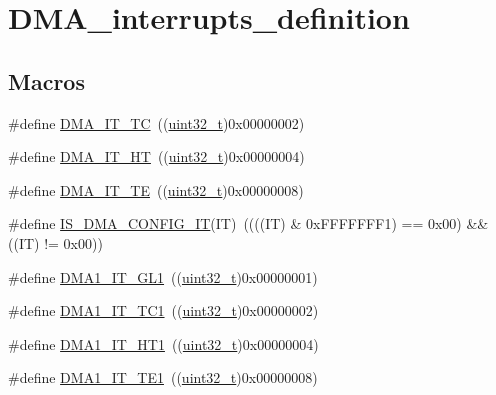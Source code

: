 \hypertarget{group___d_m_a__interrupts__definition}{}\section{D\+M\+A\+\_\+interrupts\+\_\+definition}
\label{group___d_m_a__interrupts__definition}
\subsection*{Macros}
\begin{DoxyCompactItemize}
\item 
\#define \hyperlink{group___d_m_a__interrupts__definition_ga06e83dd277e0d3e5635cf8ce8dfd6e16}{D\+M\+A\+\_\+\+I\+T\+\_\+\+TC}~((\hyperlink{_p_e___types_8h_a33594304e786b158f3fb30289278f5af}{uint32\+\_\+t})0x00000002)
\item 
\#define \hyperlink{group___d_m_a__interrupts__definition_gadf11c572b9797e04a14b105fdc2e5f66}{D\+M\+A\+\_\+\+I\+T\+\_\+\+HT}~((\hyperlink{_p_e___types_8h_a33594304e786b158f3fb30289278f5af}{uint32\+\_\+t})0x00000004)
\item 
\#define \hyperlink{group___d_m_a__interrupts__definition_gaf9d92649d2a0146f663ff253d8f3b59e}{D\+M\+A\+\_\+\+I\+T\+\_\+\+TE}~((\hyperlink{_p_e___types_8h_a33594304e786b158f3fb30289278f5af}{uint32\+\_\+t})0x00000008)
\item 
\#define \hyperlink{group___d_m_a__interrupts__definition_ga47f6af7da302c19aba24516037d305e7}{I\+S\+\_\+\+D\+M\+A\+\_\+\+C\+O\+N\+F\+I\+G\+\_\+\+IT}(IT)~((((IT) \& 0x\+F\+F\+F\+F\+F\+F\+F1) == 0x00) \&\& ((\+I\+T) != 0x00))
\item 
\#define \hyperlink{group___d_m_a__interrupts__definition_ga017d35f4f6fbf5689ef39af7227bc5b0}{D\+M\+A1\+\_\+\+I\+T\+\_\+\+G\+L1}~((\hyperlink{_p_e___types_8h_a33594304e786b158f3fb30289278f5af}{uint32\+\_\+t})0x00000001)
\item 
\#define \hyperlink{group___d_m_a__interrupts__definition_ga783532083dcc6e9752feb2e982ce7426}{D\+M\+A1\+\_\+\+I\+T\+\_\+\+T\+C1}~((\hyperlink{_p_e___types_8h_a33594304e786b158f3fb30289278f5af}{uint32\+\_\+t})0x00000002)
\item 
\#define \hyperlink{group___d_m_a__interrupts__definition_gaea8c98e79c8cb420c81f7380a4c8e1da}{D\+M\+A1\+\_\+\+I\+T\+\_\+\+H\+T1}~((\hyperlink{_p_e___types_8h_a33594304e786b158f3fb30289278f5af}{uint32\+\_\+t})0x00000004)
\item 
\#define \hyperlink{group___d_m_a__interrupts__definition_ga0121b479efafe485719d14634a02d542}{D\+M\+A1\+\_\+\+I\+T\+\_\+\+T\+E1}~((\hyperlink{_p_e___types_8h_a33594304e786b158f3fb30289278f5af}{uint32\+\_\+t})0x00000008)

\end{DoxyCompactItemize}
